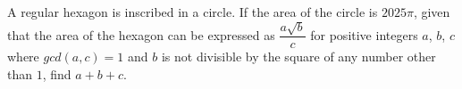 A regular hexagon is inscribed in a circle. If the area of the circle is $2025\pi$, given that the area of the hexagon can be expressed as $\dfrac{a\sqrt{b}}{c}$ for positive integers $a$, $b$, $c$ where $gcd(a, c) = 1$ and $b$ is not divisible by the square of any number other than $1$, find $a + b + c$.
